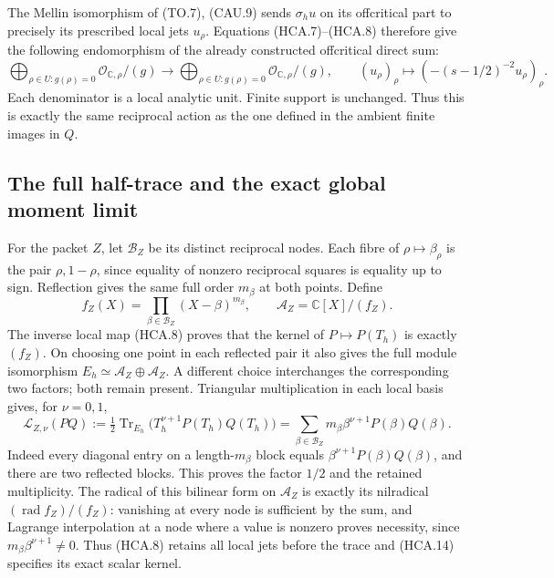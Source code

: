The Mellin isomorphism of (TO.7), (CAU.9) sends $\sigma_hu$
on its offcritical part to precisely its prescribed local jets
$u_\rho$. Equations (HCA.7)--(HCA.8) therefore give the following
endomorphism of the already constructed offcritical direct sum:
\[
 \bigoplus_{\rho\in U:g(\rho)=0}
       \mathcal O_{\mathbb C,\rho}/(g)
 \longrightarrow
 \bigoplus_{\rho\in U:g(\rho)=0}
       \mathcal O_{\mathbb C,\rho}/(g),\qquad
 (u_\rho)_\rho\longmapsto
       (-(s-1/2)^{-2}u_\rho)_\rho.
 \tag{HCA.12}
\]
Each denominator is a local analytic unit. Finite support is
unchanged. Thus this is exactly the same reciprocal action as
the one defined in the ambient finite images in $Q$.

\subsection{The full half-trace and the exact global moment limit}

For the packet $Z$, let $\mathcal B_Z$ be its distinct reciprocal
nodes. Each fibre of $\rho\mapsto\beta_\rho$ is the pair
$\rho,1-\rho$, since equality of nonzero reciprocal squares is
equality up to sign. Reflection gives the same full order $m_\beta$
at both points. Define
\[
 f_Z(X)=\prod_{\beta\in\mathcal B_Z}(X-\beta)^{m_\beta},
 \qquad\mathcal A_Z=\mathbb C[X]/(f_Z).
 \tag{HCA.13}
\]
The inverse local map (HCA.8) proves that the kernel of
$P\mapsto P(T_h)$ is exactly $(f_Z)$. On choosing one point
in each reflected pair it also gives the full module isomorphism
$E_h\simeq\mathcal A_Z\oplus\mathcal A_Z$. A different choice
interchanges the corresponding two factors; both remain present.
Triangular multiplication in each local basis gives, for $\nu=0,1$,
\[
 \mathcal L_{Z,\nu}(PQ)
 :=\tfrac12\operatorname{Tr}_{E_h}
          \bigl(T_h^{\nu+1}P(T_h)Q(T_h)\bigr)
 =\sum_{\beta\in\mathcal B_Z}m_\beta\beta^{\nu+1}P(\beta)Q(\beta).
 \tag{HCA.14}
\]
Indeed every diagonal entry on a length-$m_\beta$ block equals
$\beta^{\nu+1}P(\beta)Q(\beta)$, and there are two reflected
blocks. This proves the factor $1/2$ and the retained multiplicity.
The radical of this bilinear form on $\mathcal A_Z$ is exactly
its nilradical $(\operatorname{rad}f_Z)/(f_Z)$: vanishing at
every node is sufficient by the sum, and Lagrange interpolation
at a node where a value is nonzero proves necessity, since
$m_\beta\beta^{\nu+1}\ne0$. Thus (HCA.8) retains all local
jets before the trace and (HCA.14) specifies its exact scalar kernel.

